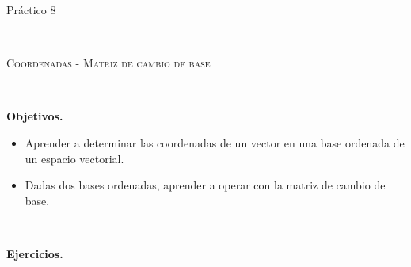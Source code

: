 \documentclass[12pt]{amsart}
\begin{document}
	
	
\centerline{\Large{Pr\' actico 8}}
	
\
	
\centerline{\textsc{Coordenadas - Matriz de cambio de base}}
	
\
	
\noindent \textbf{Objetivos.} 
	
\begin{itemize}
		
\item Aprender a determinar las coordenadas de un vector en una base ordenada de un espacio vectorial.

\item Dadas dos bases ordenadas, aprender a operar con la matriz de cambio de base.

\end{itemize}
	
	\
	
	\noindent \textbf{Ejercicios.} 
	
\end{document}
